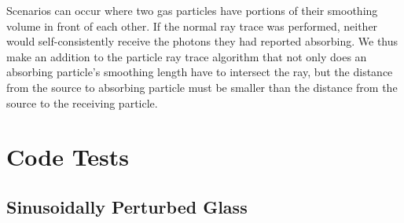 \documentclass[fleq,usenatbib]{mnras}
\begin{document}
{Scenarios can occur where two gas particles have portions of their smoothing 
volume in front of each other. If the normal ray trace was performed, neither 
would self-consistently receive the photons they had reported absorbing. We 
thus make an addition to the particle ray trace algorithm that not only does 
an absorbing particle's smoothing length have to intersect the ray, but the 
distance from the source to absorbing particle must be smaller than the 
distance from the source to the receiving particle.

\section{Code Tests}\label{sec:tsts}
\subsection{Sinusoidally Perturbed Glass}
}
\end{document}
